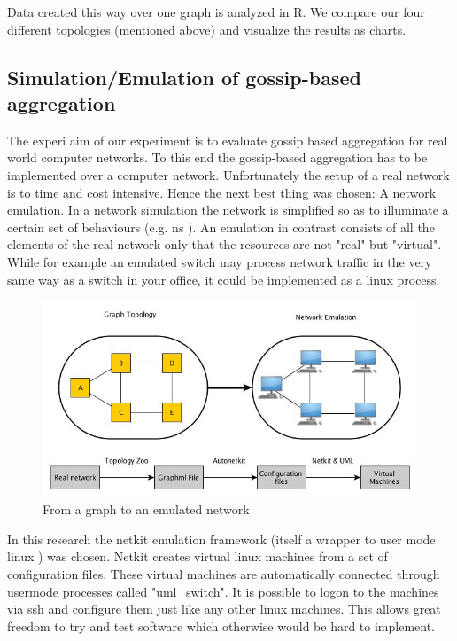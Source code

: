 Data created this way over one graph is analyzed in R. We compare our four different topologies (mentioned above) and visualize the results as charts.

\subsection{Simulation/Emulation of gossip-based aggregation}
The experi aim of our experiment is to evaluate gossip based aggregation for real world computer networks. To this end the gossip-based aggregation has to be implemented over a computer network. Unfortunately the setup of a real network is to time and cost intensive. Hence the next best thing was chosen: A network emulation. In a network simulation the network is simplified so as to illuminate a certain set of behaviours (e.g. ns \cite{ns}). An emulation in contrast consists of all the elements of the real network only that the resources are not "real" but "virtual". While for example an emulated switch may process network traffic in the very same way as a switch in your office, it could be implemented as a linux process.

\begin{figure}[h!]
    \begin{center}
        \includegraphics[scale=0.6]{graph_to_emulation}
    \end{center}
    \caption{From a graph to an emulated network}
    \label{fig:graph_to_emulation}
\end{figure}

In this research the netkit emulation framework (itself a wrapper to user mode linux \cite{uml}) was chosen. Netkit \cite{netkit} creates virtual linux machines from a set of configuration files. These virtual machines are automatically connected through usermode processes called "uml\_switch". It is possible to logon to the machines via ssh and configure them just like any other linux machines. This allows great freedom to try and test software which otherwise would be hard to implement.

